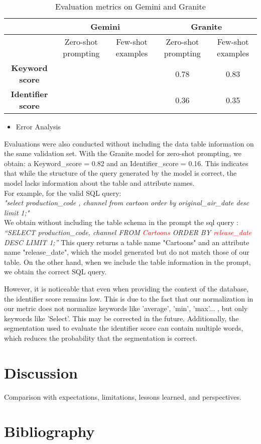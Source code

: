 \documentclass[12pt,a4paper]{article}
\begin{document}
  \begin{table}[h]
      \centering
      \small %
      \begin{tabular}{|c|c|c|c|c|}
          \hline
          & \multicolumn{2}{c|}{\textbf{Gemini}} & \multicolumn{2}{c|}{\textbf{Granite}} \\ \hline
          & Zero-shot prompting & Few-shot examples & Zero-shot prompting & Few-shot examples \\ \hline
          \textbf{Keyword score} & & & 0.78 & 0.83 \\ \hline
          \textbf{Identifier score} & & & 0.36 & 0.35 \\ \hline
      \end{tabular}
      \caption{Evaluation metrics on Gemini and Granite}
      \label{tab:comparison}
  \end{table}
  
  \begin{itemize}
  \item Error Analysis
  \end{itemize}
  
  Evaluations were also conducted without including the data table information on the same validation set. With the Granite model for zero-shot prompting, we obtain: a Keyword\_score = 0.82 and an Identifier\_score = 0.16. 
  This indicates that while the structure of the query generated by the model is correct, the model lacks information about the table and attribute names.\\
  For example, for the valid SQL query:\\ \textit{"select production\_code ,  channel from cartoon order by original\_air\_date desc limit 1;"\\}
  We obtain without including the table schema in the prompt the sql query : \\
  \textit{“SELECT production\_code, channel FROM \textcolor{red}{Cartoons} ORDER BY \textcolor{red}{release\_date} DESC LIMIT 1;”}
  This query returns a table name "Cartoons" and an attribute name "release\_date", which the model generated but do not match those of our table. On the other hand, when we include the table information in the prompt, we obtain the correct SQL query.\vspace{1cm}
  
  However, it is noticeable that even when providing the context of the database, the identifier score remains low. This is due to the fact that our normalization in our metric does not normalize keywords like 'average', 'min', 'max'... ,  but only keywords like 'Select'. This may be corrected in the future. Additionally, the segmentation used to evaluate the identifier score can contain multiple words, which reduces the probability that the segmentation is correct. 




\section*{Discussion}

Comparison with expectations, limitations, lessons learned, and perspectives.

\section*{Bibliography}


\end{document}
